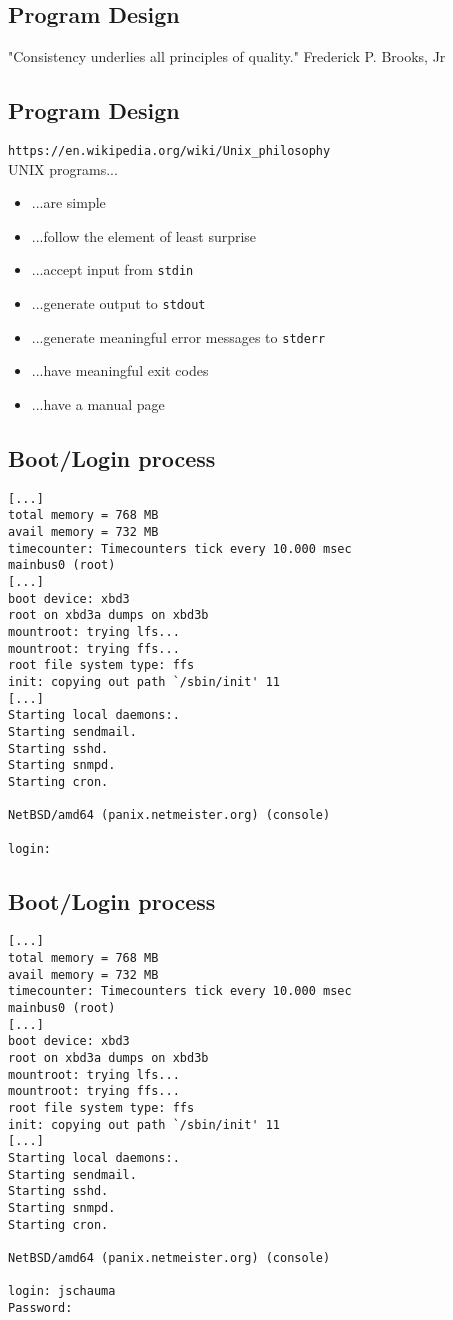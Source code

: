 \documentclass[xga]{xdvislides}
\begin{document}
\subsection{Program Design}
\vspace*{\fill}
\Huge
\begin{center}
"Consistency underlies all principles of quality." Frederick P. Brooks, Jr
\end{center}
\Normalsize
\vspace*{\fill}


\subsection{Program Design}
\verb+https://en.wikipedia.org/wiki/Unix_philosophy+ \\

UNIX programs...
\begin{itemize}
	\item ...are simple
	\item ...follow the element of least surprise
	\item ...accept input from {\tt stdin}
	\item ...generate output to {\tt stdout}
	\item ...generate meaningful error messages to {\tt stderr}
	\item ...have meaningful exit codes
	\item ...have a manual page
\end{itemize}
\subsection{Boot/Login process}
\small
\begin{verbatim}
[...]
total memory = 768 MB
avail memory = 732 MB
timecounter: Timecounters tick every 10.000 msec
mainbus0 (root)
[...]
boot device: xbd3
root on xbd3a dumps on xbd3b
mountroot: trying lfs...
mountroot: trying ffs...
root file system type: ffs
init: copying out path `/sbin/init' 11
[...]
Starting local daemons:.
Starting sendmail.
Starting sshd.
Starting snmpd.
Starting cron.

NetBSD/amd64 (panix.netmeister.org) (console)

login:
\end{verbatim}
\Normalsize

\subsection{Boot/Login process}
\small
\begin{verbatim}
[...]
total memory = 768 MB
avail memory = 732 MB
timecounter: Timecounters tick every 10.000 msec
mainbus0 (root)
[...]
boot device: xbd3
root on xbd3a dumps on xbd3b
mountroot: trying lfs...
mountroot: trying ffs...
root file system type: ffs
init: copying out path `/sbin/init' 11
[...]
Starting local daemons:.
Starting sendmail.
Starting sshd.
Starting snmpd.
Starting cron.

NetBSD/amd64 (panix.netmeister.org) (console)

login: jschauma
Password:
\end{verbatim}
\Normalsize
\end{document}
